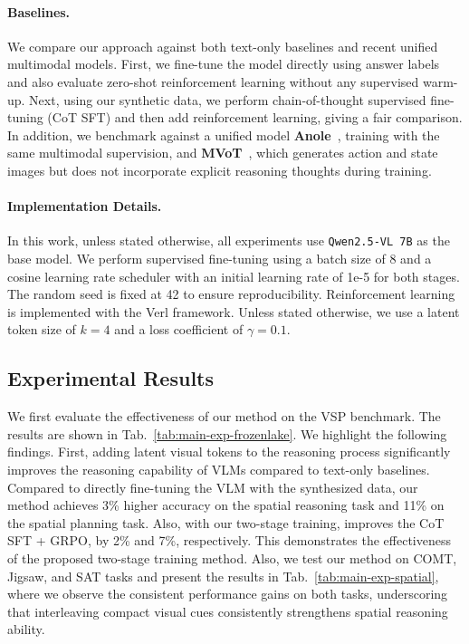 \paragraph{Baselines.}
We compare our approach against both text-only baselines and recent unified multimodal models. First, we fine-tune the model directly using answer labels and also evaluate zero-shot reinforcement learning without any supervised warm-up. Next, using our synthetic data, we perform chain-of-thought supervised fine-tuning (CoT SFT) and then add reinforcement learning, giving a fair comparison.
In addition, we benchmark against a unified model \textbf{Anole}~\citep{chern2024anole}, training with the same multimodal supervision, and \textbf{MVoT}~\citep{li2025imagine}, which generates action and state images but does not incorporate explicit reasoning thoughts during training.



\paragraph{Implementation Details.}
In this work, unless stated otherwise, all experiments use \texttt{Qwen2.5-VL 7B} as the base model. We perform supervised fine-tuning using a batch size of 8 and a cosine learning rate scheduler with an initial learning rate of 1e-5 for both stages. The random seed is fixed at 42 to ensure reproducibility.
Reinforcement learning is implemented with the Verl framework. Unless stated otherwise, we use a latent token size of $k=4$ and a loss coefficient of $\gamma=0.1$.

\subsection{Experimental Results}
\label{sec:exp-results}

We first evaluate the effectiveness of our method on the VSP benchmark. The results are shown in  Tab.~\ref{tab:main-exp-frozenlake}. We highlight the following findings.
First, adding latent visual tokens to the reasoning process significantly improves the reasoning capability of VLMs compared to text-only baselines.
Compared to directly fine-tuning the VLM with the synthesized data, our method achieves 3\% higher accuracy on the spatial reasoning task and 11\% on the spatial planning task. Also, with our two-stage training, \Model improves the CoT SFT + GRPO, by 2\% and 7\%, respectively. This demonstrates the effectiveness of the proposed two-stage training method. 
Also, we test our method on COMT, Jigsaw, and SAT tasks and present the results in Tab.~\ref{tab:main-exp-spatial}, where we observe the consistent performance gains on both tasks, underscoring that interleaving compact visual cues consistently strengthens spatial reasoning ability. 

